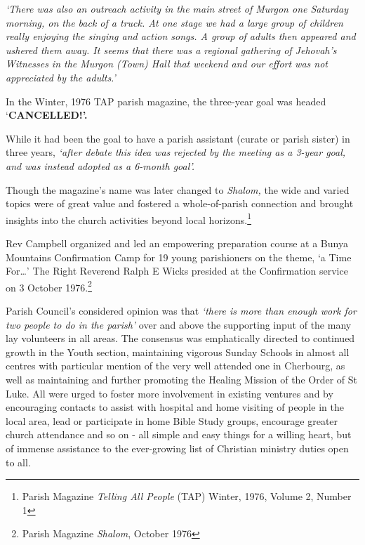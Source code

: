 \emph{`There was also an outreach activity in the main street of Murgon one Saturday morning, on the back of a truck. At one stage we had a large group of children really enjoying the singing and action songs. A group of adults then appeared and ushered them away. It seems that there was a regional gathering of Jehovah's Witnesses in the Murgon (Town) Hall that weekend and our effort was not appreciated by the adults.'}



In the Winter, 1976 TAP parish magazine, the three-year goal was headed `\textbf{CANCELLED!'.}



While it had been the goal to have a parish assistant (curate or parish sister) in three years, \emph{`after debate this idea was rejected by the meeting as a 3-year goal, and was instead adopted as a 6-month goal'.}



Though the magazine's name was later changed to \emph{Shalom,} the wide and varied topics were of great value and fostered a whole-of-parish connection and brought insights into the church activities beyond local horizons.\footnote{Parish Magazine \emph{Telling All People} (TAP) Winter, 1976, Volume 2, Number 1}


Rev Campbell organized and led an empowering preparation course at a Bunya Mountains Confirmation Camp for 19 young parishioners on the theme, `a Time For\ldots' The Right Reverend Ralph E Wicks presided at the Confirmation service on 3 October 1976.\footnote{Parish Magazine \emph{Shalom}, October 1976}


Parish Council's considered opinion was that \emph{`there is more than enough work for two people to do in the parish'} over and above the supporting input of the many lay volunteers in all areas. The consensus was emphatically directed to continued growth in the Youth section, maintaining vigorous Sunday Schools in almost all centres with particular mention of the very well attended one in Cherbourg, as well as maintaining and further promoting the Healing Mission of the Order of St Luke. All were urged to foster more involvement in existing ventures and by encouraging contacts to assist with hospital and home visiting of people in the local area, lead or participate in home Bible Study groups, encourage greater church attendance and so on - all simple and easy things for a willing heart, but of immense assistance to the ever-growing list of Christian ministry duties open to all.



